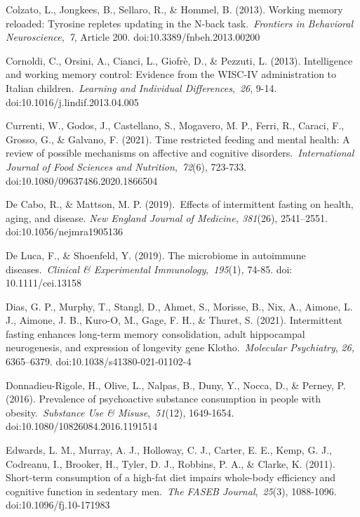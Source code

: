 \documentclass[authordate, empirical]{jote-new-article}
\begin{document}
Colzato, L., Jongkees, B., Sellaro, R., \& Hommel, B. (2013). Working memory reloaded: Tyrosine repletes updating in the N-back task. \emph{Frontiers in Behavioral Neuroscience}, \emph{7}, Article 200. doi:10.3389/fnbeh.2013.00200



Cornoldi, C., Orsini, A., Cianci, L., Giofrè, D., \& Pezzuti, L. (2013). Intelligence and working memory control: Evidence from the WISC-IV administration to Italian children. \emph{Learning and Individual Differences}, \emph{26}, 9-14. doi:10.1016/j.lindif.2013.04.005



Currenti, W., Godos, J., Castellano, S., Mogavero, M. P., Ferri, R., Caraci, F., Grosso, G., \& Galvano, F. (2021). Time restricted feeding and mental health: A review of possible mechanisms on affective and cognitive disorders. \emph{International Journal of Food Sciences and Nutrition}, \emph{72}(6), 723-733. doi:10.1080/09637486.2020.1866504



De Cabo, R., \& Mattson, M. P. (2019). Effects of intermittent fasting on health, aging, and disease.\emph{ New England Journal of Medicine, 381}(26),\emph{ }2541--2551. doi:10.1056/nejmra1905136



De Luca, F., \& Shoenfeld, Y. (2019). The microbiome in autoimmune diseases. \emph{Clinical \& Experimental Immunology}, \emph{195}(1)\emph{,} 74-85. doi: 10.1111/cei.13158



Dias, G. P., Murphy, T., Stangl, D., Ahmet, S., Morisse, B., Nix, A., Aimone, L. J., Aimone, J. B., Kuro-O, M., Gage, F. H., \& Thuret, S. (2021). Intermittent fasting enhances long-term memory consolidation, adult hippocampal neurogenesis, and expression of longevity gene Klotho. \emph{Molecular Psychiatry}, \emph{26,} 6365--6379. doi:10.1038/s41380-021-01102-4



Donnadieu-Rigole, H., Olive, L., Nalpas, B., Duny, Y., Nocca, D., \& Perney, P. (2016). Prevalence of psychoactive substance consumption in people with obesity. \emph{Substance Use \& Misuse}, \emph{51}(12), 1649-1654. doi:10.1080/10826084.2016.1191514



Edwards, L. M., Murray, A. J., Holloway, C. J., Carter, E. E., Kemp, G. J., Codreanu, I., Brooker, H., Tyler, D. J., Robbins, P. A., \& Clarke, K. (2011). Short-term consumption of a high-fat diet impairs whole-body efficiency and cognitive function in sedentary men. \emph{The FASEB Journal}, \emph{25}(3), 1088-1096. doi:10.1096/fj.10-171983
\end{document}

